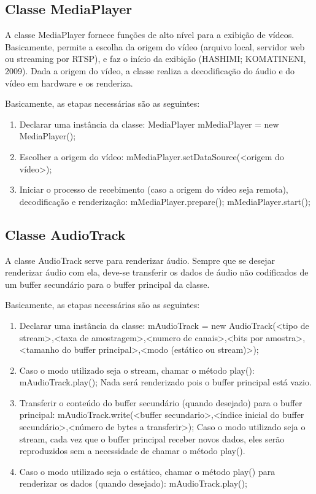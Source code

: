 \documentclass{acm_proc_article-sp}
\begin{document}
\subsection{Classe MediaPlayer}
A classe MediaPlayer fornece funções de alto nível para a exibição de vídeos. Basicamente, permite a escolha da origem do vídeo (arquivo local, servidor web ou streaming por RTSP), e faz o início da exibição (HASHIMI; KOMATINENI, 2009). Dada a origem do vídeo, a classe realiza a decodificação do áudio e do vídeo em hardware e os renderiza.

Basicamente, as etapas necessárias são as seguintes:
\begin{enumerate}
 \item Declarar uma instância da classe:
MediaPlayer mMediaPlayer = new MediaPlayer();
 \item Escolher a origem do vídeo:
mMediaPlayer.setDataSource(<origem do vídeo>);
 \item Iniciar o processo de recebimento (caso a origem do vídeo seja remota), decodificação e renderização:
mMediaPlayer.prepare();
mMediaPlayer.start();
\end{enumerate}

\subsection{Classe AudioTrack}
A classe AudioTrack serve para renderizar áudio. Sempre que se desejar renderizar áudio com ela, deve-se transferir os dados de áudio não codificados de um buffer secundário para o buffer principal da classe.

Basicamente, as etapas necessárias são as seguintes:
\begin{enumerate}
 \item Declarar uma instância da classe:
mAudioTrack = new AudioTrack(<tipo de stream>,<taxa de amostragem>,<numero de canais>,<bits por amostra>,<tamanho do buffer principal>,<modo (estático ou stream)>);
 \item Caso o modo utilizado seja o stream, chamar o método play():
mAudioTrack.play();
Nada será renderizado pois o buffer principal está vazio.
 \item Transferir o conteúdo do buffer secundário (quando desejado) para o buffer principal:
mAudioTrack.write(<buffer secundario>,<índice inicial do buffer secundário>,<número de bytes a transferir>);
Caso o modo utilizado seja o stream, cada vez que o buffer principal receber novos dados, eles serão reproduzidos sem a necessidade de chamar o método play().
 \item Caso o modo utilizado seja o estático, chamar o método play() para renderizar os dados (quando desejado):
mAudioTrack.play();
\end{enumerate}
\end{document}
